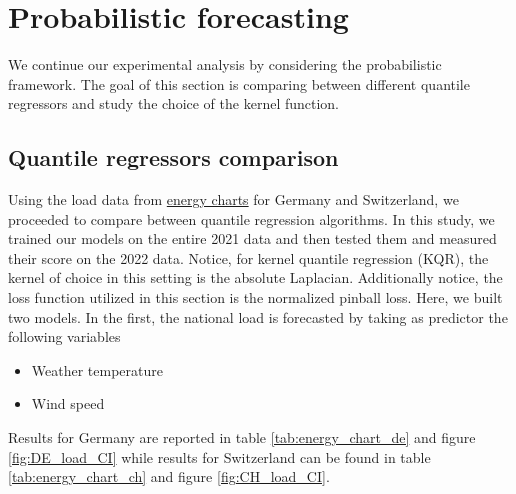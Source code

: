 \section{Probabilistic forecasting}
We continue our experimental analysis by considering the probabilistic framework. The goal of this section is comparing between different quantile regressors and study the choice of the kernel function.

\subsection{Quantile regressors comparison}
Using the load data from \href{https://www.energy-charts.info/index.html?l=en&c=DE}{energy charts} for Germany and Switzerland, we proceeded to compare between quantile regression algorithms. In this study, we trained our models on the entire 2021 data and then tested them and measured their score on the 2022 data.
Notice, for kernel quantile regression (KQR), the kernel of choice in this setting is the absolute Laplacian. Additionally notice, the loss function utilized in this section is the normalized pinball loss. 
Here, we built two models. In the first, the national load is forecasted by taking as predictor the following variables
\begin{itemize}
    \item Weather temperature
    \item Wind speed
\end{itemize}
Results for Germany are reported in table \ref{tab:energy_chart_de} and figure \ref{fig:DE_load_CI} while results for Switzerland can be found in table \ref{tab:energy_chart_ch} and figure \ref{fig:CH_load_CI}.

